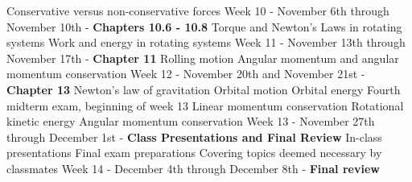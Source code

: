 \documentclass[10pt]{article}
\begin{document}
\begin{outline}[enumerate]
\2 Conservative versus non-conservative forces
\1 Week 10 - November 6th through November 10th - \textbf{Chapters 10.6 - 10.8}
\2 Torque and Newton's Laws in rotating systems
\2 Work and energy in rotating systems
\1 Week 11 - November 13th through November 17th - \textbf{Chapter 11}
\2 Rolling motion
\2 Angular momentum and angular momentum conservation
\1 Week 12 - November 20th and November 21st - \textbf{Chapter 13}
\2 Newton's law of gravitation
\2 Orbital motion
\2 Orbital energy
\1 Fourth midterm exam, beginning of week 13
\2 Linear momentum conservation
\2 Rotational kinetic energy
\2 Angular momentum conservation
\1 Week 13 - November 27th through December 1st  - \textbf{Class Presentations and Final Review}
\2 In-class presentations
\2 Final exam preparations
\2 Covering topics deemed necessary by classmates
\1 Week 14 - December 4th through December 8th - \textbf{Final review}
\end{outline}
\end{document}
